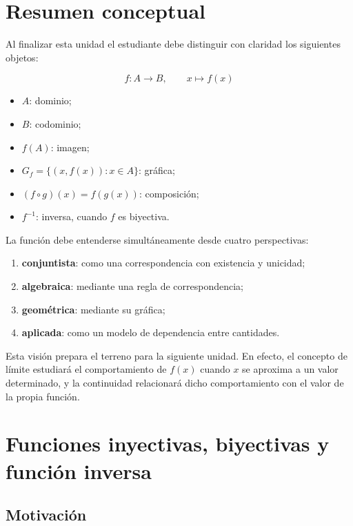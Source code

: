 \documentclass[12pt]{article}
\theoremstyle{remark}
\begin{document}
\section{Resumen conceptual}

Al finalizar esta unidad el estudiante debe distinguir con claridad los
siguientes objetos:

\[
\boxed{
f:A\to B,\qquad x\mapsto f(x)
}
\]

\begin{itemize}
    \item $A$: dominio;
    \item $B$: codominio;
    \item $f(A)$: imagen;
    \item $G_f=\{(x,f(x)):x\in A\}$: gráfica;
    \item $(f\circ g)(x)=f(g(x))$: composición;
    \item $f^{-1}$: inversa, cuando $f$ es biyectiva.
\end{itemize}

La función debe entenderse simultáneamente desde cuatro perspectivas:
\begin{enumerate}
    \item \textbf{conjuntista}: como una correspondencia con existencia y
    unicidad;
    \item \textbf{algebraica}: mediante una regla de correspondencia;
    \item \textbf{geométrica}: mediante su gráfica;
    \item \textbf{aplicada}: como un modelo de dependencia entre cantidades.
\end{enumerate}

Esta visión prepara el terreno para la siguiente unidad. En efecto, el concepto
de límite estudiará el comportamiento de $f(x)$ cuando $x$ se aproxima a un
valor determinado, y la continuidad relacionará dicho comportamiento con el
valor de la propia función.
\appendix
\section{Funciones inyectivas, biyectivas y función inversa}
\label{ap:inyectivas-biyectivas-inversa}

\subsection{Motivación}
\end{document}
